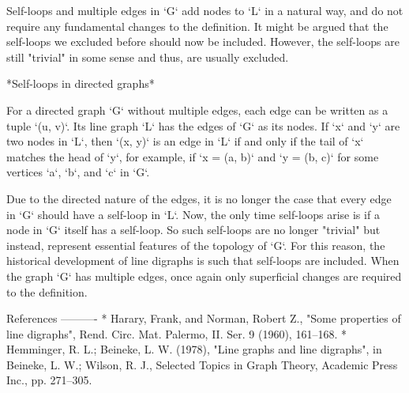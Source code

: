 \begin{DoxyVerb}
Self-loops and multiple edges in `G` add nodes to `L` in a natural way, and
do not require any fundamental changes to the definition. It might be
argued that the self-loops we excluded before should now be included.
However, the self-loops are still "trivial" in some sense and thus, are
usually excluded.

*Self-loops in directed graphs*

For a directed graph `G` without multiple edges, each edge can be written
as a tuple `(u, v)`. Its line graph `L` has the edges of `G` as its
nodes. If `x` and `y` are two nodes in `L`, then `(x, y)` is an edge in `L`
if and only if the tail of `x` matches the head of `y`, for example, if `x
= (a, b)` and `y = (b, c)` for some vertices `a`, `b`, and `c` in `G`.

Due to the directed nature of the edges, it is no longer the case that
every edge in `G` should have a self-loop in `L`. Now, the only time
self-loops arise is if a node in `G` itself has a self-loop.  So such
self-loops are no longer "trivial" but instead, represent essential
features of the topology of `G`. For this reason, the historical
development of line digraphs is such that self-loops are included. When the
graph `G` has multiple edges, once again only superficial changes are
required to the definition.

References
----------
* Harary, Frank, and Norman, Robert Z., "Some properties of line digraphs",
  Rend. Circ. Mat. Palermo, II. Ser. 9 (1960), 161--168.
* Hemminger, R. L.; Beineke, L. W. (1978), "Line graphs and line digraphs",
  in Beineke, L. W.; Wilson, R. J., Selected Topics in Graph Theory,
  Academic Press Inc., pp. 271--305.\end{DoxyVerb}
 